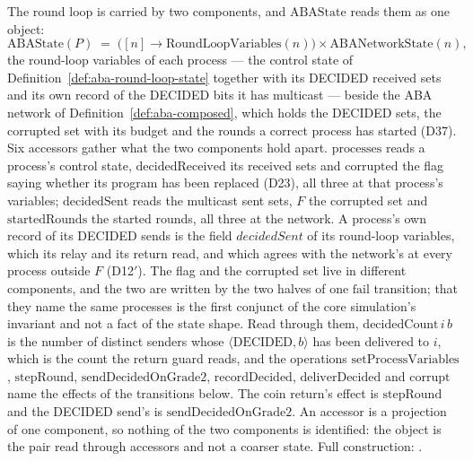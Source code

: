 \begin{definition}
  \label{def:aba-state}
  \leanok
  The round loop is carried by two components, and $\mathrm{ABAState}$ reads them as one object:
  \[
    \mathrm{ABAState}(P) \;=\;
      \bigl([n] \to \mathrm{RoundLoopVariables}(n)\bigr) \times \mathrm{ABANetworkState}(n),
  \]
  the round-loop variables of each process --- the control state of Definition~\ref{def:aba-round-loop-state} together with its DECIDED received sets and its own record of the DECIDED bits it has multicast --- beside the ABA network of Definition~\ref{def:aba-composed}, which holds the DECIDED sets, the corrupted set with its budget and the rounds a correct process has started (D37).
  Six accessors gather what the two components hold apart.
  $\mathrm{processes}$ reads a process's control state, $\mathrm{decidedReceived}$ its received sets and $\mathrm{corrupted}$ the flag saying whether its program has been replaced (D23), all three at that process's variables; $\mathrm{decidedSent}$ reads the multicast sent sets, $F$ the corrupted set and $\mathrm{startedRounds}$ the started rounds, all three at the network.
  A process's own record of its DECIDED sends is the field $decidedSent$ of its round-loop variables, which its relay and its return read, and which agrees with the network's at every process outside $F$ (D12$'$).
  The flag and the corrupted set live in different components, and the two are written by the two halves of one $\mathrm{fail}$ transition; that they name the same processes is the first conjunct of the core simulation's invariant and not a fact of the state shape.
  Read through them, $\mathrm{decidedCount}\,i\,b$ is the number of distinct senders whose $\langle\mathrm{DECIDED},b\rangle$ has been delivered to $i$, which is the count the return guard reads, and the operations $\mathrm{setProcessVariables}$, $\mathrm{stepRound}$, $\mathrm{sendDecidedOnGrade2}$, $\mathrm{recordDecided}$, $\mathrm{deliverDecided}$ and $\mathrm{corrupt}$ name the effects of the transitions below.
  The coin return's effect is $\mathrm{stepRound}$ and the DECIDED send's is $\mathrm{sendDecidedOnGrade2}$.
  An accessor is a projection of one component, so nothing of the two components is identified: the object is the pair read through accessors and not a coarser state.
  Full construction: .
\end{definition}
